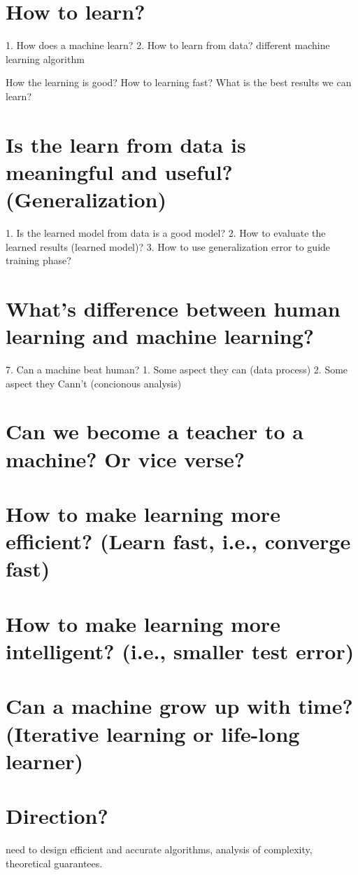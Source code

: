 \section{How to learn?}
1. How does a machine learn?
2. How to learn from data?
different machine learning algorithm

How the learning is good?
How to learning fast?
What is the best results we can learn?

\section{Is the learn from data is meaningful and useful? (Generalization)    }
1. Is the learned model from data is a good model?
2. How to evaluate the learned results (learned model)?
3. How to use generalization error to guide training phase?

\section{What’s difference between human learning and machine learning?}
7. Can a machine beat human?
1. Some aspect they can (data process)
2. Some aspect they Cann’t (concionous analysis)

\section{Can we become a teacher to a machine? Or vice verse?}

\section{How to make learning more efficient? (Learn fast, i.e., converge fast)}

\section{How to make learning more intelligent? (i.e., smaller test error)}

\section{Can a machine grow up with time? (Iterative learning or life-long learner)}


\section{Direction?}

need to design efficient and accurate algorithms, analysis of complexity, theoretical guarantees.


